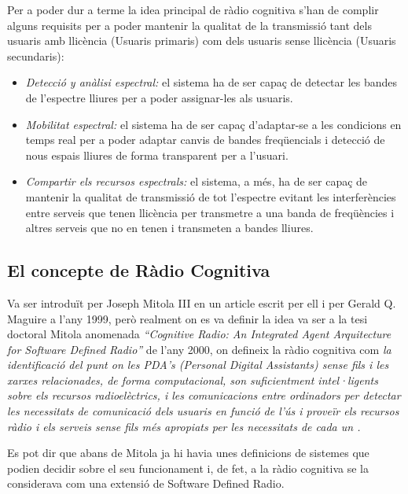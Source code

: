 \documentclass[10pt,journal,a4paper]{IEEEtran}
\begin{document}
Per a poder dur a terme la idea principal de ràdio cognitiva s'han de complir alguns requisits per a poder mantenir la qualitat de la transmissió tant dels usuaris amb llicència (Usuaris primaris) com dels usuaris sense llicència (Usuaris secundaris):
\begin{itemize}
\item \emph{Detecció y anàlisi espectral:} el sistema ha de ser capaç de detectar les bandes de l'espectre lliures per a poder assignar-les als usuaris.
\item \emph{Mobilitat espectral:} el sistema ha de ser capaç d'adaptar-se a les condicions en temps real per a poder adaptar canvis de bandes freqüencials i detecció de nous espais lliures de forma transparent per a l'usuari.
\item \emph{Compartir els recursos espectrals:} el sistema, a més, ha de ser capaç de mantenir la qualitat de transmissió de tot l'espectre evitant les interferències entre serveis que tenen llicència per transmetre a una banda de freqüències i altres serveis que no en tenen i transmeten a bandes lliures. 
\end{itemize}
\subsection{El concepte de Ràdio Cognitiva}
Va ser introduït per Joseph Mitola III en un article escrit per ell i per 
Gerald Q. Maguire a l'any 1999, però realment on es va definir la idea va ser a la tesi doctoral Mitola anomenada \emph{“Cognitive Radio: An Integrated
Agent Arquitecture for Software Defined Radio”} de l'any 2000, on defineix la ràdio cognitiva com
\emph{la identificació del punt  on les PDA's (Personal Digital Assistants) sense fils i les xarxes relacionades, de forma computacional, son suficientment intel·ligents sobre els recursos radioelèctrics, i les comunicacions entre ordinadors per detectar les necessitats de comunicació dels usuaris en funció de l'ús i
proveïr els recursos ràdio i els serveis sense fils més apropiats per les necessitats de cada un \cite{III_2000}.}

Es pot dir que abans de Mitola ja hi havia unes definicions de sistemes que podien decidir sobre el seu funcionament \cite{fetweiss} i, de fet, a la ràdio cognitiva se la considerava com una extensió de Software Defined Radio.
\end{document}
